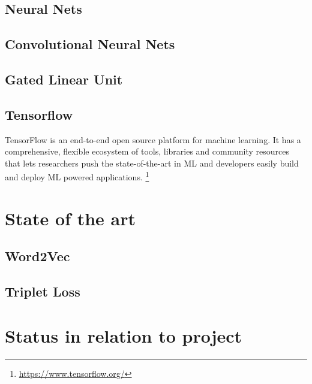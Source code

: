 \subsection{Neural Nets}
\label{sub:Neural-Nets}

\subsection{Convolutional Neural Nets}
\label{sub:Convolutional-Neural-Nets}

\subsection{Gated Linear Unit}
\label{sub:Gated-Linear-Unit}

\subsection{Tensorflow}
\label{sub:Tensorflow}

TensorFlow is an end-to-end open source platform for machine learning. It has a comprehensive, flexible ecosystem of tools, libraries and community resources that lets researchers push the state-of-the-art in \gls{ML} and developers easily build and deploy \gls{ML} powered applications. \footnote{\url{https://www.tensorflow.org/}}

\section{State of the art}
\label{sec:State-of-art}

\subsection{Word2Vec}
\label{sub:word2wec}

\subsection{Triplet Loss}
\label{sub:Triplet-Loss}

\section{Status in relation to project}
\label{sec:Status-Relation-Project}
